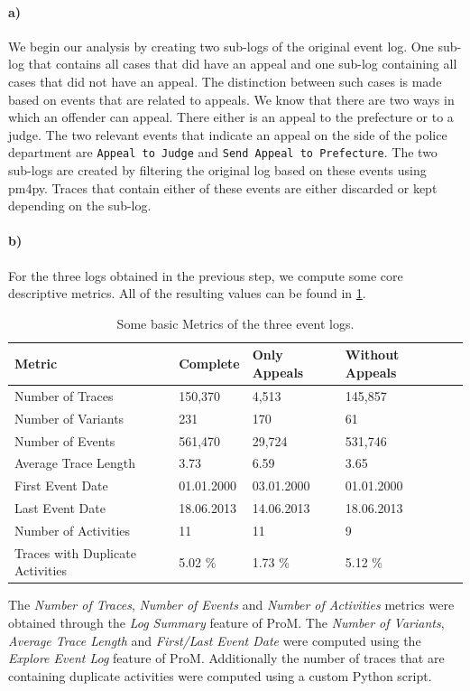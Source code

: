 \documentclass[12pt]{report}
\begin{document}
\paragraph{\textbf{a)}}
We begin our analysis by creating two sub-logs of the original event log. One sub-log that contains all cases that did have an appeal and one sub-log containing all cases that did not have an appeal. The distinction between such cases is made based on events that are related to appeals. We know that there are two ways in which an offender can appeal. There either is an appeal to the prefecture or to a judge. The two relevant events that indicate an appeal on the side of the police department are \texttt{Appeal to Judge} and \texttt{Send Appeal to Prefecture}. The two sub-logs are created by filtering the original log based on these events using pm4py. Traces that contain either of these events are either discarded or kept depending on the sub-log.

\paragraph{\textbf{b)}}
For the three logs obtained in the previous step, we compute some core descriptive metrics. All of the resulting values can be found in \ref{tab:1b}.
\begin{table}[H]
\centering
\begin{tabular}{|l|l|l|l|l|}
	\hline \textbf{Metric} & \textbf{Complete} & \textbf{Only Appeals} & \textbf{Without Appeals} \\
	\hline Number of Traces & 150,370 & 4,513 & 145,857\\
	\hline Number of Variants & 231 & 170 &61\\
	\hline Number of Events & 561,470 & 29,724 & 531,746\\
	\hline Average Trace Length & 3.73 & 6.59 & 3.65\\
	\hline First Event Date & 01.01.2000 & 03.01.2000 & 01.01.2000\\
	\hline Last Event Date & 18.06.2013 & 14.06.2013 & 18.06.2013\\
	\hline Number of Activities & 11 & 11 & 9 \\
	\hline Traces with Duplicate Activities  & 5.02 \% & 1.73 \% & 5.12 \%\\
	\hline
\end{tabular}
\caption{Some basic Metrics of the three event logs.}
\label{tab:1b}
\end{table}
The \emph{Number of Traces}, \emph{Number of Events} and \emph{Number of Activities} metrics were obtained through the \emph{Log Summary} feature of ProM. The \emph{Number of Variants}, \emph{Average Trace Length} and \emph{First/Last Event Date} were computed using the \emph{Explore Event Log} feature of ProM. Additionally the number of traces that are containing duplicate activities were computed using a custom Python script.
\end{document}
